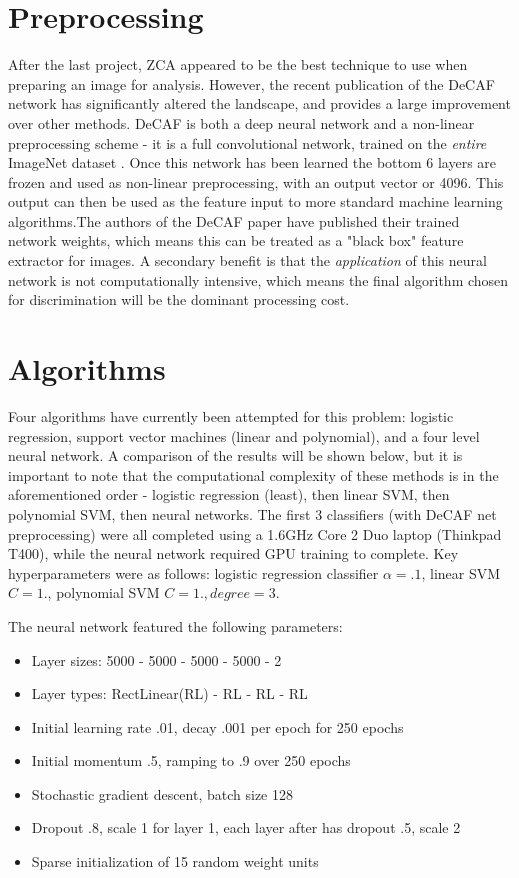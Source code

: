 \documentclass[journal]{IEEEtran}
\begin{document}
\section{Preprocessing}
After the last project, ZCA \cite{ZCA} appeared to be the best technique to use
when preparing an image for analysis. However, the recent publication of the 
DeCAF network \cite{DeCAF} has significantly altered the landscape, and
provides a large improvement over other methods. DeCAF is both a deep neural
network and a non-linear preprocessing scheme - it is a full convolutional 
network, trained on the \emph{entire} ImageNet dataset \cite{TorontoImageNet}.
Once this network has been learned the bottom 6 layers are frozen and used as
non-linear preprocessing, with an output vector or 4096. This output can then 
be used as the feature input to more standard machine learning algorithms.The
authors of the DeCAF paper have published their trained network weights, which
means this can be treated as a "black box" feature extractor for images. A 
secondary benefit is that the \emph{application} of this neural network is not
computationally intensive, which means the final algorithm chosen for
discrimination will be the dominant processing cost.

\section{Algorithms}
Four algorithms have currently been attempted for this problem: logistic
regression, support vector machines (linear and polynomial), and a four level
neural network. A comparison of the results will be shown below, but it is 
important to note that the computational complexity of these methods is in the
aforementioned order - logistic regression (least), then linear SVM, then 
polynomial SVM, then neural networks. The first 3 classifiers (with DeCAF net
preprocessing) were all completed using a 1.6GHz Core 2 Duo laptop 
(Thinkpad T400), while the neural network required GPU training to complete.
Key hyperparameters were as follows: logistic regression classifier 
$\alpha=.1$, linear SVM $C=1.$, polynomial SVM $C=1., degree=3$.

The neural network featured the following parameters:
\begin{itemize}
\item Layer sizes: 5000 - 5000 - 5000 - 5000 - 2
\item Layer types: RectLinear(RL) - RL - RL - RL
\item Initial learning rate .01, decay .001 per epoch for 250 epochs
\item Initial momentum .5, ramping to .9 over 250 epochs
\item Stochastic gradient descent, batch size 128 
\item Dropout .8, scale 1 for layer 1, each layer after has dropout .5, scale 2
\item Sparse initialization of 15 random weight units 
\end{itemize}
\end{document}
